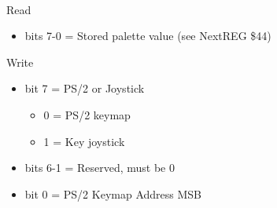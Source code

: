 \\
Read
\begin{itemize}
\item bits 7-0 = Stored palette value (see NextREG \$44)
\end{itemize}
Write  
\begin{itemize}
\item bit 7 = PS/2 or Joystick
\begin{itemize}
\item 0 = PS/2 keymap
\item 1 = Key joystick
\end{itemize}
\item bits 6-1 = Reserved, must be 0
\item bit 0 = PS/2 Keymap Address MSB
\end{itemize}

